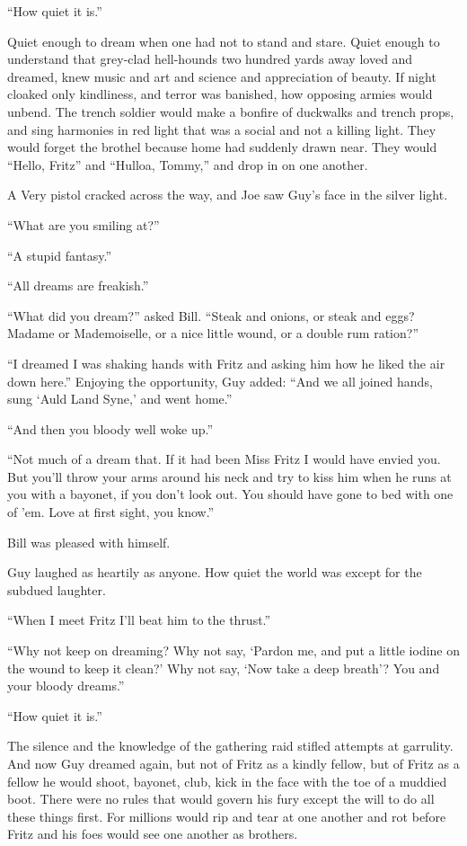 ``How quiet it is.''

Quiet enough to dream when one had not to stand and stare. Quiet enough to understand that grey-clad hell-hounds two hundred yards away loved and dreamed, knew music and art and science and appreciation of beauty. If night cloaked only kindliness, and terror was banished, how opposing armies would unbend. The trench soldier would make a bonfire of duckwalks and trench props, and sing harmonies in red light that was a social and not a killing light. They would forget the brothel because home had suddenly drawn near. They would ``Hello, Fritz'' and ``Hulloa, Tommy,'' and drop in on one another.

A Very pistol cracked across the way, and Joe saw Guy's face in the silver light.

``What are you smiling at?''

``A stupid fantasy.''

``All dreams are freakish.''

``What did you dream?'' asked Bill. ``Steak and onions, or steak and eggs? Madame or Mademoiselle, or a nice little wound, or a double rum ration?''

``I dreamed I was shaking hands with Fritz and asking him how he liked the air down here.'' Enjoying the opportunity, Guy added: ``And we all joined hands, sung `Auld Land Syne,' and went home.''

``And then you bloody well woke up.''

``Not much of a dream that. If it had been Miss Fritz I would have envied you. But you'll throw your arms around his neck and try to kiss him when he runs at you with a bayonet, if you don't look out. You should have gone to bed with one of 'em. Love at first sight, you know.''

Bill was pleased with himself.

Guy laughed as heartily as anyone. How quiet the world was except for the subdued laughter.

``When I meet Fritz I'll beat him to the thrust.''

``Why not keep on dreaming? Why not say, `Pardon me, and put a little iodine on the wound to keep it clean?' Why not say, `Now take a deep breath'? You and your bloody dreams.''

``How quiet it is.''

The silence and the knowledge of the gathering raid stifled attempts at garrulity. And now Guy dreamed again, but not of Fritz as a kindly fellow, but of Fritz as a fellow he would shoot, bayonet, club, kick in the face with the toe of a muddied boot. There were no rules that would govern his fury except the will to do all these things first. For millions would rip and tear at one another and rot before Fritz and his foes would see one another as brothers.

